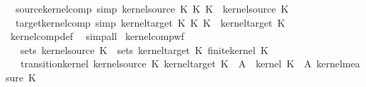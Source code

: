 \begin{isabellebody}
\isanewline
{}\isamarkupfalse%
\isanewline
\ \ source{\isacharunderscore}{\kern0pt}kernel{\isacharunderscore}{\kern0pt}comp\ {\isacharbrackleft}{\kern0pt}simp{\isacharbrackright}{\kern0pt}{\isacharcolon}{\kern0pt}\ {\isachardoublequoteopen}kernel{\isacharunderscore}{\kern0pt}source\ {\isacharparenleft}{\kern0pt}K\ {\isasymcirc}\isactrlsub K\ K\ {\isacharequal}{\kern0pt}\ kernel{\isacharunderscore}{\kern0pt}source\ K\ \isanewline
\ \ target{\isacharunderscore}{\kern0pt}kernel{\isacharunderscore}{\kern0pt}comp\ {\isacharbrackleft}{\kern0pt}simp{\isacharbrackright}{\kern0pt}{\isacharcolon}{\kern0pt}\ {\isachardoublequoteopen}kernel{\isacharunderscore}{\kern0pt}target\ {\isacharparenleft}{\kern0pt}K\ {\isasymcirc}\isactrlsub K\ K\ {\isacharequal}{\kern0pt}\ kernel{\isacharunderscore}{\kern0pt}target\ K\isanewline
%
\isadelimproof
\ \ %
\endisadelimproof
%
\isatagproof
{}\isamarkupfalse%
\ kernel{\isacharunderscore}{\kern0pt}comp{\isacharunderscore}{\kern0pt}def\ \isamarkupfalse%
\ simp{\isacharunderscore}{\kern0pt}all%
\endisatagproof
{\isafoldproof}%
%
\isadelimproof
\isanewline
%
\endisadelimproof
\isanewline
{}\isamarkupfalse%
\ kernel{\isacharunderscore}{\kern0pt}comp{\isacharunderscore}{\kern0pt}wf{\isacharcolon}{\kern0pt}\isanewline
\ \ \ {\isachardoublequoteopen}sets\ {\isacharparenleft}{\kern0pt}kernel{\isacharunderscore}{\kern0pt}source\ K\ {\isacharequal}{\kern0pt}\ sets\ {\isacharparenleft}{\kern0pt}kernel{\isacharunderscore}{\kern0pt}target\ K\ {\isachardoublequoteopen}finite{\isacharunderscore}{\kern0pt}kernel\ K\isanewline
\ \ \ {\isachardoublequoteopen}transition{\isacharunderscore}{\kern0pt}kernel\ {\isacharparenleft}{\kern0pt}kernel{\isacharunderscore}{\kern0pt}source\ K\ {\isacharparenleft}{\kern0pt}kernel{\isacharunderscore}{\kern0pt}target\ K\ {\isacharparenleft}{\kern0pt}{\isasymlambda}{\isasymomega}\ A\ {\isasymintegral}\isactrlsup {\isacharplus}{\kern0pt}{\isasymomega}\ kernel\ K\ {\isasymomega}\ A\ {\isasympartial}{\isacharparenleft}{\kern0pt}{\isacharparenleft}{\kern0pt}kernel{\isacharunderscore}{\kern0pt}measure\ K\ {\isasymomega}\isanewline

\end{isabellebody}
